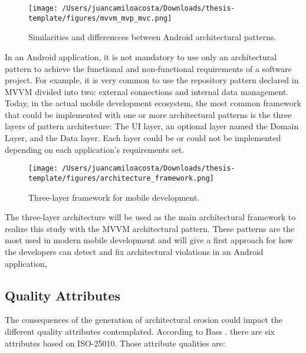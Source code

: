\begin{figure}
    \centering
    \texttt{[image: /Users/juancamiloacosta/Downloads/thesis-template/figures/mvvm\_mvp\_mvc.png]}
    \caption{Similarities and differencces between Android architectural patterns. \citet{} }
    \label{fig:concept-map}
\end{figure}


In an Android application, it is not mandatory to use only an architectural pattern to achieve the functional and non-functional requirements of a software project. For example, it is very common to use the repository pattern declared in MVVM divided into two: external connections and internal data management. Today, in the actual mobile development ecosystem, the most common framework that could be implemented with one or more architectural patterns is the three layers of pattern architecture: The UI layer, an optional layer named the Domain Layer, and the Data layer. Each layer could be or could not be implemented depending on each application's requirements set. 

\begin{figure}
    \centering
    \texttt{[image: /Users/juancamiloacosta/Downloads/thesis-template/figures/architecture\_framework.png]}
    \caption{Three-layer framework for mobile development. \citet{} }
    \label{fig:concept-map}
\end{figure}

The three-layer architecture will be used as the main architectural framework to realize this study with the MVVM architectural pattern. These patterns are the most used in modern mobile development and will give a first approach for how the developers can detect and fix architectural violations in an Android application,

\subsection{Quality Attributes}
The consequences of the generation of architectural erosion could impact the different quality attributes contemplated. According to Bass \citet{bass-architecture-book}. there are six attributes based on ISO-25010. Those attribute qualities are:

